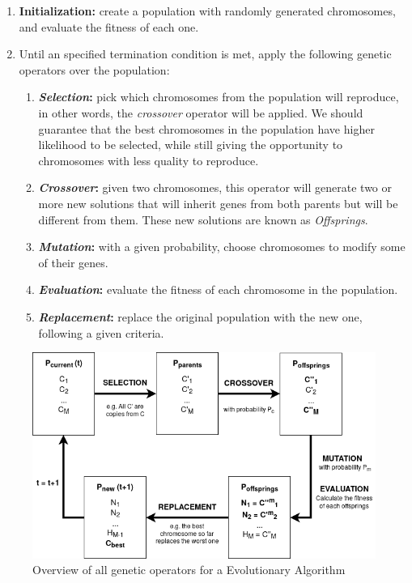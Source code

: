 \begin{enumerate}
    \item \textbf{Initialization:} create a population with randomly generated chromosomes, and evaluate the fitness of each one.
    
    \item Until an specified termination condition is met, apply the following genetic operators over the population:
    
    \begin{enumerate}
        \item \textbf{\textit{Selection}:} pick which chromosomes from the population will reproduce, in other words, the \textit{crossover} operator will be applied. We should guarantee that the best chromosomes in the population have higher likelihood to be selected, while still giving the opportunity to chromosomes with less quality to reproduce.
    
        \item \textbf{\textit{Crossover}:} given two chromosomes, this operator will generate two or more new solutions that will inherit genes from both parents but will be different from them. These new solutions are known as \textit{Offsprings}.
        
        \item \textbf{\textit{Mutation}:} with a given probability, choose chromosomes to modify some of their genes.
        
        \item \textbf{\textit{Evaluation}:} evaluate the fitness of each chromosome in the population.
        
        \item \textbf{\textit{Replacement}:} replace the original population with the new one, following a given criteria. 
        
    \end{enumerate}     
\end{enumerate}

\begin{figure}[h!]
\centering
    \includegraphics[width=\linewidth]{assets/images/EA_diagram.png}
    \caption{Overview of all genetic operators for a Evolutionary Algorithm}
    \label{fig:EA_diagram}
\end{figure}


